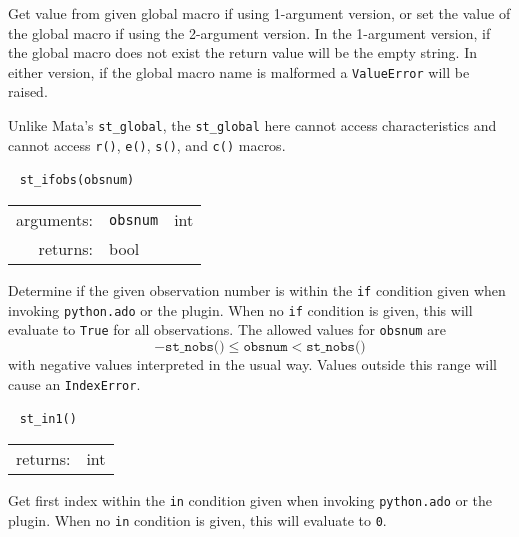 \documentclass{article}
\begin{document}
			\vspace{1.5mm}
			\noindent Get value from given global macro if using 1-argument version, or set the value of the global macro if using the 2-argument version. In the 1-argument version, if the global macro does not exist the return value will be the empty string. In either version, if the global macro name is malformed a \lstinline{ValueError} will be raised. 
			
			Unlike Mata's \lstinline{st_global}, the \lstinline{st_global} here cannot access characteristics and cannot access \lstinline{r()}, \lstinline{e()}, \lstinline{s()}, and \lstinline{c()} macros. \newline
			
			
			\ \newline
			\noindent \lstinline$st_ifobs(obsnum)$
								
			\vspace{1.5mm}
			\noindent 
			\indent \begin{tabular}{rrl}
					arguments: & \texttt{obsnum} & int \\
					returns: & \multicolumn{2}{l}{bool}
				\end{tabular}
								
			\vspace{1.5mm}
			\noindent Determine if the given observation number is within the \texttt{if} condition given when invoking \lstinline{python.ado} or the plugin. When no \texttt{if} condition is given, this will evaluate to \texttt{True} for all observations. The allowed values for \lstinline{obsnum} are 
			\[
				-\texttt{st\_nobs()} \leq \texttt{obsnum} < \texttt{st\_nobs()}
			\]
			with negative values interpreted in the usual way. Values outside this range will cause an \lstinline{IndexError}.\newline
			
			
			\ \newline
			\noindent \lstinline$st_in1()$
								
			\vspace{1.5mm}
			\noindent 
			\indent \begin{tabular}{rl}
					returns: & int
				\end{tabular}
								
			\vspace{1.5mm}
			\noindent Get first index within the \texttt{in} condition given when invoking \lstinline{python.ado} or the plugin. When no \texttt{in} condition is given, this will evaluate to \texttt{0}. \newline
			
\end{document}
